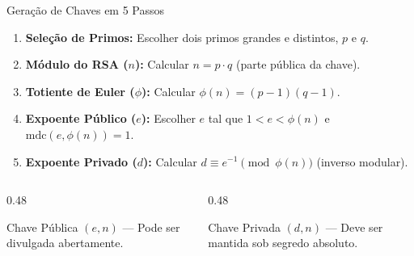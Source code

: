 \documentclass[aspectratio=169, 10pt]{beamer}
\begin{document}
\begin{frame}{Geração de Chaves em 5 Passos}
    \begin{enumerate}
        \item \textbf{Seleção de Primos:} Escolher dois primos grandes e distintos, $p$ e $q$.
        \item \textbf{Módulo do RSA ($n$):} Calcular $n = p \cdot q$ (parte pública da chave).
        \item \textbf{Totiente de Euler ($\phi$):} Calcular $\phi(n) = (p - 1)(q - 1)$.
        \item \textbf{Expoente Público ($e$):} Escolher $e$ tal que $1 < e < \phi(n)$ e $\text{mdc}(e, \phi(n)) = 1$.
        \item \textbf{Expoente Privado ($d$):} Calcular $d \equiv e^{-1} \pmod{\phi(n)}$ (inverso modular).
    \end{enumerate}

    \begin{columns}[T]
        \begin{column}{0.48\textwidth}
            \begin{block}{Chave Pública}
                $(e, n)$ --- Pode ser divulgada abertamente.
            \end{block}
        \end{column}
        \begin{column}{0.48\textwidth}
            \begin{block}{Chave Privada}
                $(d, n)$ --- Deve ser mantida sob segredo absoluto.
            \end{block}
        \end{column}
    \end{columns}
\end{frame}
\end{document}
